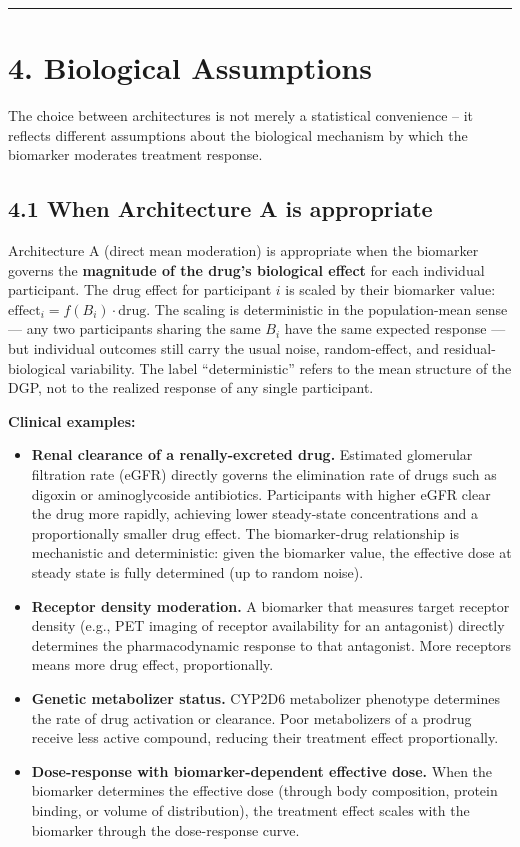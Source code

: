 \documentclass[11pt]{article}
\begin{document}
\bigskip\noindent\rule{\textwidth}{0.4pt}\bigskip

\section{4. Biological Assumptions}

The choice between architectures is not merely a statistical
convenience -- it reflects different assumptions about the
biological mechanism by which the biomarker moderates treatment
response.

\subsection{4.1 When Architecture A is appropriate}

Architecture A (direct mean moderation) is appropriate when the
biomarker governs the \textbf{magnitude of the drug's biological
effect} for each individual participant. The drug effect for
participant $i$ is scaled by their biomarker value:
$\text{effect}_i = f(B_i) \cdot \text{drug}$. The scaling is
deterministic in the population-mean sense --- any two
participants sharing the same $B_i$ have the same expected
response --- but individual outcomes still carry the usual noise,
random-effect, and residual-biological variability. The label
``deterministic'' refers to the mean structure of the DGP, not to
the realized response of any single participant.

\textbf{Clinical examples:}

\begin{itemize}
\item \textbf{Renal clearance of a renally-excreted drug.} Estimated
  glomerular filtration rate (eGFR) directly governs the
  elimination rate of drugs such as digoxin or aminoglycoside
  antibiotics. Participants with higher eGFR clear the drug more
  rapidly, achieving lower steady-state concentrations and a
  proportionally smaller drug effect. The biomarker-drug
  relationship is mechanistic and deterministic: given the
  biomarker value, the effective dose at steady state is fully
  determined (up to random noise).

\item \textbf{Receptor density moderation.} A biomarker that measures
  target receptor density (e.g., PET imaging of receptor
  availability for an antagonist) directly determines the
  pharmacodynamic response to that antagonist. More receptors
  means more drug effect, proportionally.

\item \textbf{Genetic metabolizer status.} CYP2D6 metabolizer phenotype
  determines the rate of drug activation or clearance. Poor
  metabolizers of a prodrug receive less active compound,
  reducing their treatment effect proportionally.

\item \textbf{Dose-response with biomarker-dependent effective dose.}
  When the biomarker determines the effective dose (through
  body composition, protein binding, or volume of distribution),
  the treatment effect scales with the biomarker through the
  dose-response curve.
\end{itemize}
\end{document}
